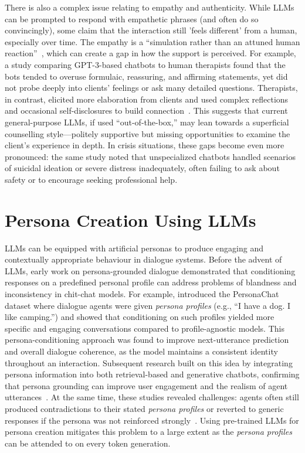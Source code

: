 There is also a complex issue relating to empathy and authenticity. While LLMs can be prompted to respond with empathetic phrases (and often do so convincingly), some claim that the interaction still 'feels different' from a human, especially over time. The empathy is a ``simulation rather than an attuned human reaction''~\cite{SEITZ2024100067}, which can create a gap in how the support is perceived. For example, a study comparing GPT-3-based chatbots to human therapists found that the bots tended to overuse formulaic, reassuring, and affirming statements, yet did not probe deeply into clients' feelings or ask many detailed questions. Therapists, in contrast, elicited more elaboration from clients and used complex reflections and occasional self-disclosures to build connection~\cite{Scholich2025}. This suggests that current general-purpose LLMs, if used ``out-of-the-box,'' may lean towards a superficial counselling style---politely supportive but missing opportunities to examine the client's experience in depth. In crisis situations, these gaps become even more pronounced: the same study noted that unspecialized chatbots handled scenarios of suicidal ideation or severe distress inadequately, often failing to ask about safety or to encourage seeking professional help.


\section{Persona Creation Using LLMs}
LLMs can be equipped with artificial personas to produce engaging and contextually appropriate behaviour in dialogue systems. Before the advent of LLMs, early work on persona-grounded dialogue demonstrated that conditioning responses on a predefined personal profile can address problems of blandness and inconsistency in chit-chat models. For example, \citet{zhang-etal-2018-personalizing} introduced the PersonaChat dataset where dialogue agents were given \emph{persona profiles} (e.g., ``I have a dog. I like camping.'') and showed that conditioning on such profiles yielded more specific and engaging conversations compared to profile-agnostic models. This persona-conditioning approach was found to improve next-utterance prediction and overall dialogue coherence, as the model maintains a consistent identity throughout an interaction. Subsequent research built on this idea by integrating persona information into both retrieval-based and generative chatbots, confirming that persona grounding can improve user engagement and the realism of agent utterances~\cite{roller-etal-2021-recipes, li-etal-2016-persona}. At the same time, these studies revealed challenges: agents often still produced contradictions to their stated \emph{persona profiles} or reverted to generic responses if the persona was not reinforced strongly~\cite{kim-etal-2020-will, song-etal-2020-generate}. Using pre-trained LLMs for persona creation mitigates this problem to a large extent as the \emph{persona profiles} can be attended to on every token generation.

